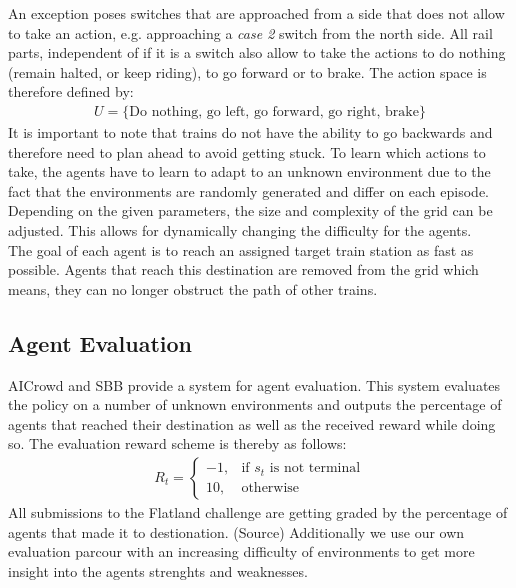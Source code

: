 An exception poses switches that are approached from a side that does not allow to take an action, e.g. approaching a \textit{case 2} switch from the north side.
All rail parts, independent of if it is a switch also allow to take the actions to do nothing (remain halted, or keep riding), to go forward or to brake.
The action space is therefore defined by:
\begin{gather*}
U = \{ \text{Do nothing, go left, go forward, go right, brake} \}
\end{gather*}
It is important to note that trains do not have the ability to go backwards and therefore need to plan ahead to avoid getting stuck. To learn which actions to take, the agents have to learn to adapt to an unknown environment due to the fact that the environments are randomly generated and differ on each episode. Depending on the given parameters, the size and complexity of the grid can be adjusted. This allows for dynamically changing the difficulty for the agents.\\
The goal of each agent is to reach an assigned target train station as fast as possible. Agents that reach this destination are removed from the grid which means, they can no longer obstruct the path of other trains.
\subsection*{Agent Evaluation}\label{rl_agent_eval}
AICrowd and SBB provide a system for agent evaluation. This system evaluates the policy on a number of unknown environments and outputs the percentage of agents that reached their destination as well as the received reward while doing so. The evaluation reward scheme is thereby as follows:
\begin{gather*}
R_{t}= 
\begin{cases}
-1,				& \text{if } s_{t} \text{ is not terminal}\\
10,             & \text{otherwise}
\end{cases}
\end{gather*}
All submissions to the Flatland challenge are getting graded by the percentage of agents that made it to destionation. (Source) Additionally we use our own evaluation parcour with an increasing difficulty of environments to get more insight into the agents strenghts and weaknesses.

